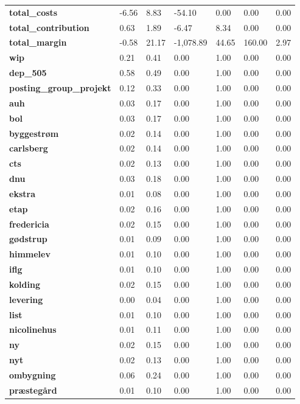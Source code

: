 \begin{landscape}
\begin{longtable}{lllllll}
\textbf{total\_costs} & -6.56 & 8.83 & -54.10 & 0.00 & 0.00 & 0.00 \\
\textbf{total\_contribution} & 0.63 & 1.89 & -6.47 & 8.34 & 0.00 & 0.00 \\
\textbf{total\_margin} & -0.58 & 21.17 & -1,078.89 & 44.65 & 160.00 & 2.97 \\
\textbf{wip} & 0.21 & 0.41 & 0.00 & 1.00 & 0.00 & 0.00 \\
\textbf{dep\_505} & 0.58 & 0.49 & 0.00 & 1.00 & 0.00 & 0.00 \\
\textbf{posting\_group\_projekt} & 0.12 & 0.33 & 0.00 & 1.00 & 0.00 & 0.00 \\
\textbf{auh} & 0.03 & 0.17 & 0.00 & 1.00 & 0.00 & 0.00 \\
\textbf{bol} & 0.03 & 0.17 & 0.00 & 1.00 & 0.00 & 0.00 \\
\textbf{byggestrøm} & 0.02 & 0.14 & 0.00 & 1.00 & 0.00 & 0.00 \\
\textbf{carlsberg} & 0.02 & 0.14 & 0.00 & 1.00 & 0.00 & 0.00 \\
\textbf{cts} & 0.02 & 0.13 & 0.00 & 1.00 & 0.00 & 0.00 \\
\textbf{dnu} & 0.03 & 0.18 & 0.00 & 1.00 & 0.00 & 0.00 \\
\textbf{ekstra} & 0.01 & 0.08 & 0.00 & 1.00 & 0.00 & 0.00 \\
\textbf{etap} & 0.02 & 0.16 & 0.00 & 1.00 & 0.00 & 0.00 \\
\textbf{fredericia} & 0.02 & 0.15 & 0.00 & 1.00 & 0.00 & 0.00 \\
\textbf{gødstrup} & 0.01 & 0.09 & 0.00 & 1.00 & 0.00 & 0.00 \\
\textbf{himmelev} & 0.01 & 0.10 & 0.00 & 1.00 & 0.00 & 0.00 \\
\textbf{iflg} & 0.01 & 0.10 & 0.00 & 1.00 & 0.00 & 0.00 \\
\textbf{kolding} & 0.02 & 0.15 & 0.00 & 1.00 & 0.00 & 0.00 \\
\textbf{levering} & 0.00 & 0.04 & 0.00 & 1.00 & 0.00 & 0.00 \\
\textbf{list} & 0.01 & 0.10 & 0.00 & 1.00 & 0.00 & 0.00 \\
\textbf{nicolinehus} & 0.01 & 0.11 & 0.00 & 1.00 & 0.00 & 0.00 \\
\textbf{ny} & 0.02 & 0.15 & 0.00 & 1.00 & 0.00 & 0.00 \\
\textbf{nyt} & 0.02 & 0.13 & 0.00 & 1.00 & 0.00 & 0.00 \\
\textbf{ombygning} & 0.06 & 0.24 & 0.00 & 1.00 & 0.00 & 0.00 \\
\textbf{præstegård} & 0.01 & 0.10 & 0.00 & 1.00 & 0.00 & 0.00 \\

\end{longtable}
\end{landscape}
